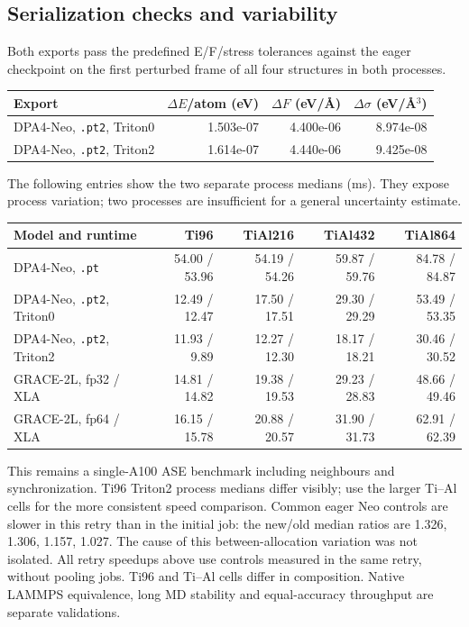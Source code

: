 \subsection*{Serialization checks and variability}
Both exports pass the predefined E/F/stress tolerances against the eager
checkpoint on the first perturbed frame of all four structures in both processes.
\begin{center}\small
\begin{tabular}{@{}lrrr@{}}
\toprule
Export & $\Delta E$/atom (eV) & $\Delta F$ (eV/\AA) & $\Delta\sigma$ (eV/\AA$^3$) \\
\midrule
DPA4-Neo, \texttt{.pt2}, Triton0 & 1.503e-07 & 4.400e-06 & 8.974e-08 \\
DPA4-Neo, \texttt{.pt2}, Triton2 & 1.614e-07 & 4.440e-06 & 9.425e-08 \\
\bottomrule
\end{tabular}\end{center}
The following entries show the two separate process medians (ms). They
expose process variation; two processes are insufficient for a general uncertainty estimate.
\begin{center}\footnotesize
\begin{tabular}{@{}lrrrr@{}}
\toprule
Model and runtime & Ti96 & TiAl216 & TiAl432 & TiAl864 \\
\midrule
DPA4-Neo, \texttt{.pt} & 54.00 / 53.96 & 54.19 / 54.26 & 59.87 / 59.76 & 84.78 / 84.87 \\
DPA4-Neo, \texttt{.pt2}, Triton0 & 12.49 / 12.47 & 17.50 / 17.51 & 29.30 / 29.29 & 53.49 / 53.35 \\
DPA4-Neo, \texttt{.pt2}, Triton2 & 11.93 / 9.89 & 12.27 / 12.30 & 18.17 / 18.21 & 30.46 / 30.52 \\
GRACE-2L, fp32 / XLA & 14.81 / 14.82 & 19.38 / 19.53 & 29.23 / 28.83 & 48.66 / 49.46 \\
GRACE-2L, fp64 / XLA & 16.15 / 15.78 & 20.88 / 20.57 & 31.90 / 31.73 & 62.91 / 62.39 \\
\bottomrule
\end{tabular}\end{center}
This remains a single-A100 ASE benchmark including neighbours and synchronization.
Ti96 Triton2 process medians differ visibly; use the larger Ti--Al cells for
the more consistent speed comparison. Common eager Neo controls are slower
in this retry than in the initial job: the new/old median ratios are 1.326, 1.306, 1.157, 1.027.
The cause of this between-allocation variation was not isolated. All retry
speedups above use controls measured in the same retry, without pooling jobs.
Ti96 and Ti--Al cells differ in composition. Native LAMMPS equivalence,
long MD stability and equal-accuracy throughput are separate validations.
